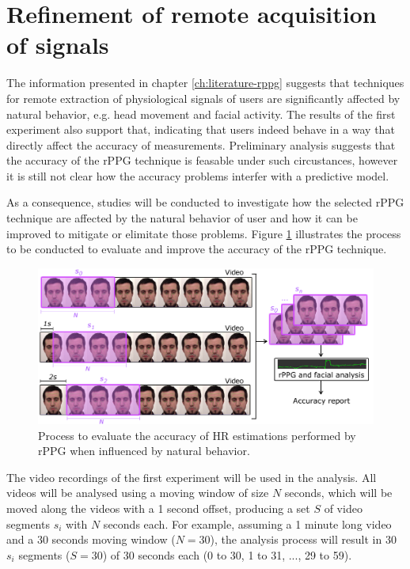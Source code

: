 \section{Refinement of remote acquisition of signals}

The information presented in chapter \ref{ch:literature-rppg} suggests that techniques for remote extraction of physiological signals of users are significantly affected by natural behavior, e.g. head movement and facial activity. The results of the first experiment also support that, indicating that users indeed behave in a way that directly affect the accuracy of measurements. Preliminary analysis \parencite{bevilacqua2017accuracy} suggests that the accuracy of the rPPG technique is feasable under such circustances, however it is still not clear how the accuracy problems interfer with a predictive model.

As a consequence, studies will be conducted to investigate how the selected rPPG technique are affected by the natural behavior of user and how it can be improved to mitigate or elimitate those problems. Figure \ref{fig:rppg-accuracy-study} illustrates the process to be conducted to evaluate and improve the accuracy of the rPPG technique.

\begin{figure}[h]
    \centering
    \includegraphics[width=\textwidth]{figures/rppg-accuracy-study}
    \caption{Process to evaluate the accuracy of HR estimations performed by rPPG when influenced by natural behavior.}
    \label{fig:rppg-accuracy-study}
\end{figure}

The video recordings of the first experiment will be used in the analysis. All videos will be analysed using a moving window of size $N$ seconds, which will be moved along the videos with a 1 second offset, producing a set $S$ of video segments $s_i$ with $N$ seconds each. For example, assuming a 1 minute long video and a 30 seconds moving window ($N=30$), the analysis process will result in 30 $s_i$ segments ($S=30$) of 30 seconds each (0 to 30, 1 to 31, ..., 29 to 59).

